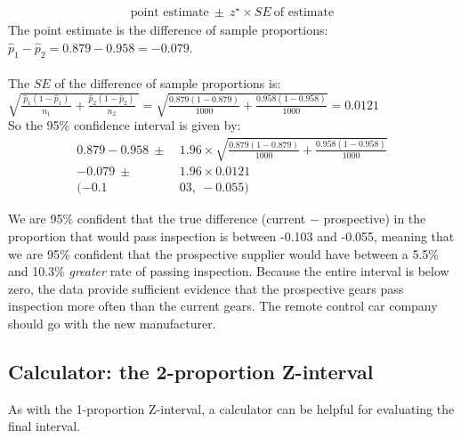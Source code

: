 \begin{examplewrap}
\begin{nexample}
\begin{description}
\begin{align*}
\text{point estimate}\ \pm\ z^{\star} \times SE\ \text{of estimate}
\end{align*}
The point estimate is the difference of sample proportions: $\hat{p}_1-\hat{p}_2 = 0.879 - 0.958 = -0.079$. \\ 
\\
The $SE$ of the difference of sample proportions is:  \\
$\sqrt{\frac{\ \hat{p}_1(1-\hat{p}_1)\ }{n_1}+ \frac{\hat{p}_2(1-\hat{p}_2)}{n_2}\ } = \sqrt{\frac{0.879(1-0.879)}{1000} +\frac{0.958(1-0.958)}{1000}}= 0.0121$ \\

So the 95\% confidence interval is given by:
\begin{align*}
0.879 - 0.958 \ \pm \ &1.96 \times  \sqrt{\frac{0.879(1-0.879)}{1000} +\frac{0.958(1-0.958)}{1000}}\\
-0.079\ \pm\ &1.96 \times 0.0121 \\
(-0.1&03,\ -0.055)
\end{align*}

\item[\inferencestep{Conclude}]  We are 95\% confident that the true difference (current $-$ prospective) in the proportion that would pass inspection is between -0.103 and -0.055, meaning that we are 95\% confident that the prospective supplier would have between a 5.5\% and 10.3\% \emph{greater} rate of passing inspection.  Because the entire interval is below zero, the data provide sufficient evidence that the prospective gears pass inspection more often than the current gears. The remote control car company should go with the new manufacturer.
\end{description}
\end{nexample}
\end{examplewrap}



\subsection{Calculator: the 2-proportion Z-interval}
\label{2propZint}
As with the 1-proportion Z-interval, a calculator can be helpful for evaluating the final interval.

